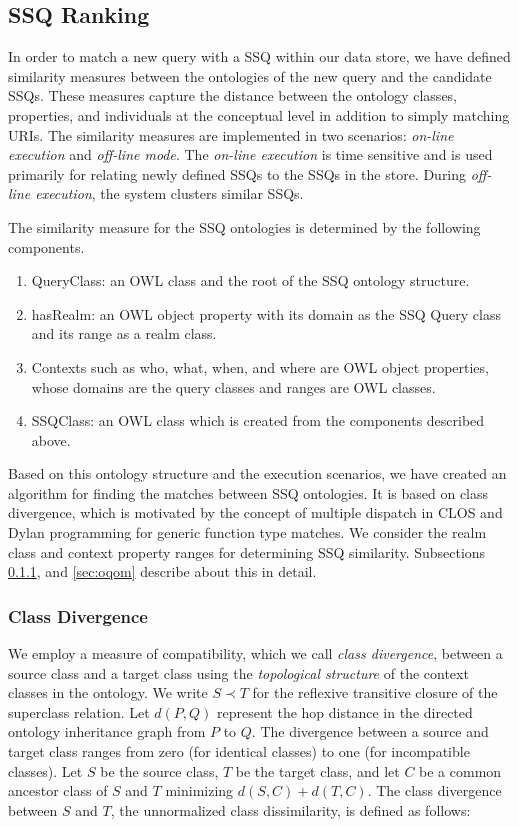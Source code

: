 \subsection{SSQ Ranking}
\label{sec:ssq}
In order to match a new query with a SSQ within our data store, we
have defined similarity measures between the ontologies of the new
query and the candidate SSQs. These measures capture the distance
between the ontology classes, properties, and individuals at the
conceptual level in addition to simply matching URIs. The similarity
measures are implemented in two scenarios: \textit{on-line execution}
and \textit{off-line mode}. The \textit{on-line execution} is time
sensitive and is used primarily for relating newly defined SSQs to the
SSQs in the store. During \textit{off-line execution}, the system
clusters similar SSQs.

The similarity measure for the SSQ ontologies is determined by the
following components.
\begin{enumerate}
    \item QueryClass: an OWL class and the root of the SSQ ontology
      structure.
    \item hasRealm: an OWL object property with its domain as the SSQ
      Query class and its range as a realm class.
    \item Contexts such as who, what, when, and where are OWL object
      properties, whose domains are the query classes and ranges are
      OWL classes.
    \item SSQClass: an OWL class which is created from the components
      described above.
\end{enumerate}
Based on this ontology structure and the execution scenarios, we have
created an algorithm for finding the matches between SSQ
ontologies. It is based on class divergence, which is motivated by the
concept of multiple dispatch in CLOS \cite{95411} and Dylan
programming \cite{DBLP:conf/oopsla/BarrettCHMPW96} for generic
function type matches. We consider the realm class and context
property ranges for determining SSQ similarity. Subsections
\ref{sec:ctd}, and \ref{sec:oqom} describe about this in detail.


\subsubsection{Class Divergence}
\label{sec:ctd}
We employ a measure of compatibility, which we call \textit{class
  divergence}, between a source class and a target class using the
\textit{topological structure} of the context classes in the
ontology. We write $S \prec T$ for the reflexive transitive closure of
the superclass relation. Let $d(P,Q)$ represent the hop distance in
the directed ontology inheritance graph from $P$ to $Q$. The
divergence between a source and target class ranges from zero (for
identical classes) to one (for incompatible classes).  Let $S$ be the
source class, $T$ be the target class, and let $C$ be a common
ancestor class of $S$ and $T$ minimizing $d(S,C) + d(T,C)$. The class
divergence between $S$ and $T$, the unnormalized class dissimilarity,
is defined as follows:


